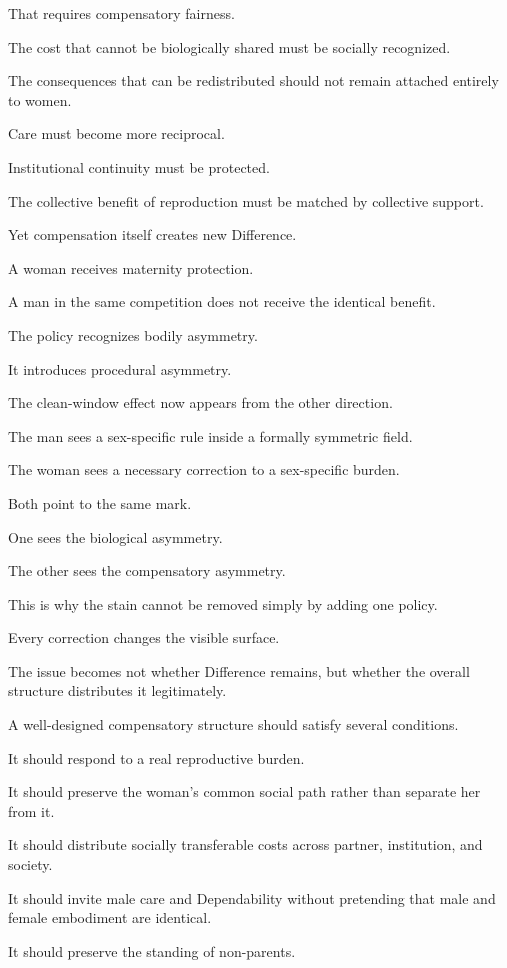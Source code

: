 That requires compensatory fairness.

The cost that cannot be biologically shared must be socially recognized.

The consequences that can be redistributed should not remain attached entirely to women.

Care must become more reciprocal.

Institutional continuity must be protected.

The collective benefit of reproduction must be matched by collective support.

Yet compensation itself creates new Difference.

A woman receives maternity protection.

A man in the same competition does not receive the identical benefit.

The policy recognizes bodily asymmetry.

It introduces procedural asymmetry.

The clean-window effect now appears from the other direction.

The man sees a sex-specific rule inside a formally symmetric field.

The woman sees a necessary correction to a sex-specific burden.

Both point to the same mark.

One sees the biological asymmetry.

The other sees the compensatory asymmetry.

This is why the stain cannot be removed simply by adding one policy.

Every correction changes the visible surface.

The issue becomes not whether Difference remains, but whether the overall structure distributes it legitimately.

A well-designed compensatory structure should satisfy several conditions.

It should respond to a real reproductive burden.

It should preserve the woman’s common social path rather than separate her from it.

It should distribute socially transferable costs across partner, institution, and society.

It should invite male care and Dependability without pretending that male and female embodiment are identical.

It should preserve the standing of non-parents.

